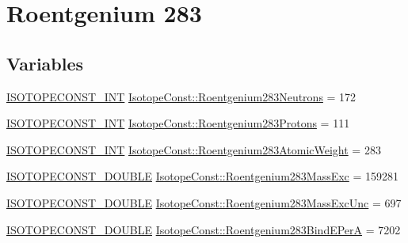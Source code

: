 \hypertarget{group___isotope_const-_roentgenium-_rg283}{}\section{Roentgenium 283}
\label{group___isotope_const-_roentgenium-_rg283}
\subsection*{Variables}
\begin{DoxyCompactItemize}
\item 
\mbox{\hyperlink{group___isotope_const-_macros_ga5f18360b3e99483a35c32d789e62621c}{I\+S\+O\+T\+O\+P\+E\+C\+O\+N\+S\+T\+\_\+\+I\+NT}} \mbox{\hyperlink{group___isotope_const-_roentgenium-_rg283_ga5b8d906d6144f9693c26bb3ee7f5493c}{Isotope\+Const\+::\+Roentgenium283\+Neutrons}} = 172
\item 
\mbox{\hyperlink{group___isotope_const-_macros_ga5f18360b3e99483a35c32d789e62621c}{I\+S\+O\+T\+O\+P\+E\+C\+O\+N\+S\+T\+\_\+\+I\+NT}} \mbox{\hyperlink{group___isotope_const-_roentgenium-_rg283_ga1c09b233d9cfe1cfa64e903b64a94a31}{Isotope\+Const\+::\+Roentgenium283\+Protons}} = 111
\item 
\mbox{\hyperlink{group___isotope_const-_macros_ga5f18360b3e99483a35c32d789e62621c}{I\+S\+O\+T\+O\+P\+E\+C\+O\+N\+S\+T\+\_\+\+I\+NT}} \mbox{\hyperlink{group___isotope_const-_roentgenium-_rg283_gad17343b13cf120c09006e86fa2ac6e37}{Isotope\+Const\+::\+Roentgenium283\+Atomic\+Weight}} = 283
\item 
\mbox{\hyperlink{group___isotope_const-_macros_ga8f45a7272ce02c0b4c65c44636ed719a}{I\+S\+O\+T\+O\+P\+E\+C\+O\+N\+S\+T\+\_\+\+D\+O\+U\+B\+LE}} \mbox{\hyperlink{group___isotope_const-_roentgenium-_rg283_ga9b792efa995b11d176326eb2db44d829}{Isotope\+Const\+::\+Roentgenium283\+Mass\+Exc}} = 159281
\item 
\mbox{\hyperlink{group___isotope_const-_macros_ga8f45a7272ce02c0b4c65c44636ed719a}{I\+S\+O\+T\+O\+P\+E\+C\+O\+N\+S\+T\+\_\+\+D\+O\+U\+B\+LE}} \mbox{\hyperlink{group___isotope_const-_roentgenium-_rg283_ga96d64c518fdb1e0f24c8304153801b9e}{Isotope\+Const\+::\+Roentgenium283\+Mass\+Exc\+Unc}} = 697
\item 
\mbox{\hyperlink{group___isotope_const-_macros_ga8f45a7272ce02c0b4c65c44636ed719a}{I\+S\+O\+T\+O\+P\+E\+C\+O\+N\+S\+T\+\_\+\+D\+O\+U\+B\+LE}} \mbox{\hyperlink{group___isotope_const-_roentgenium-_rg283_ga85a41fdb23cef94b3857da9efbdc0782}{Isotope\+Const\+::\+Roentgenium283\+Bind\+E\+PerA}} = 7202

\end{DoxyCompactItemize}
